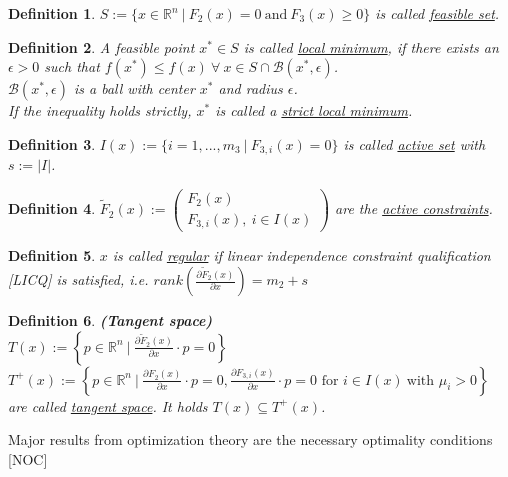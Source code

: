 \documentclass{scrartcl}[12pt, halfparskip]
\numberwithin{equation}{section}
\numberwithin{figure}{section}
\numberwithin{table}{section}
\newtheorem{Definition}{Definition}
\begin{document}
\begin{Definition}
	$S := \{ x \in \mathbb{R}^n \ | \ F_2(x) = 0 \ \text{and} \ F_3(x) \ge 0 \}$ is called \underline{feasible set}.
\end{Definition}

\begin{Definition}
	A feasible point $x^* \in S$ is called \underline{local minimum}, if there exists an $\epsilon > 0$ such that $f(x^*) \le f(x) \ \forall \ x \in S \cap \mathcal{B}(x^*, \epsilon)$. \\
	$\mathcal{B}(x^*, \epsilon)$ is a ball with center $x^*$ and radius $\epsilon$. \\
	If the inequality holds strictly, $x^*$ is called a \underline{strict local minimum}.
\end{Definition}

\begin{Definition}
	$I(x) := \{ i=1,...,m_3 \ | \ F_{3,i}(x) = 0 \}$ is called \underline{active set} with $s := \vert I \vert$.
\end{Definition}

\begin{Definition}
	$\tilde{F}_2(x) := 
	\begin{pmatrix}
		F_2(x) \\
		F_{3,i}(x), \ i \in I(x) 
	\end{pmatrix}$
	are the \underline{active constraints}.
\end{Definition}

\begin{Definition}
	$x$ is called \underline{regular} if linear independence constraint qualification [LICQ] is satisfied, i.e. $rank \left( \frac{\partial \tilde F_2(x)}{\partial x} \right) = m_2 + s$
\end{Definition}

\begin{Definition}
	\textbf{(Tangent space)} \\
	$T(x) := \left\{ p \in \mathbb{R}^n \ | \ \frac{\partial \tilde F_2(x)}{\partial x} \cdot p = 0 \right\}$ \\
	$T^+(x) := \left\{ p \in \mathbb{R}^n \ | \ \frac{\partial F_2(x)}{\partial x} \cdot p = 0, \frac{\partial F_{3,i}(x)}{\partial x} \cdot p = 0 \text{ for } i \in I(x) \ \text{with } \mu_i > 0 \right\}$ \\
	are called \underline{tangent space}. It holds $T(x) \subseteq T^+(x)$.
\end{Definition}

Major results from optimization theory are the necessary optimality conditions [NOC]
\end{document}
